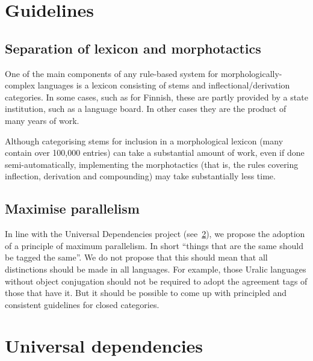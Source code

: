 \documentclass[free]{flammie}
\begin{document}
\section{Guidelines}
\label{sec:guidelines}

\subsection{Separation of lexicon and morphotactics}

One of the main components of any rule-based system for morphologically-complex languages is a lexicon consisting of stems and inflectional/derivation categories. In some cases, such as for Finnish, these are partly provided by a state institution, such as a language board. In other cases they are the product of many years of work.

Although categorising stems for inclusion in a morphological lexicon (many contain over 100,000 entries) can take a substantial amount of work, even if done semi-automatically, implementing the morphotactics (that is, the rules covering inflection, derivation and compounding) may take substantially less time.

\subsection{Maximise parallelism}

In line with the Universal Dependencies project (see~\ref{sec:universal}), we propose the adoption of a principle of maximum parallelism. In short ``things that are the same should be tagged the same''. We do not propose that this should mean that all distinctions should be made in all languages. For example, those Uralic languages without object conjugation should not be required to adopt the agreement tags of those that have it. But it should be possible to come up with principled and consistent guidelines for closed categories.


\section{Universal dependencies}
\label{sec:universal}
\end{document}
